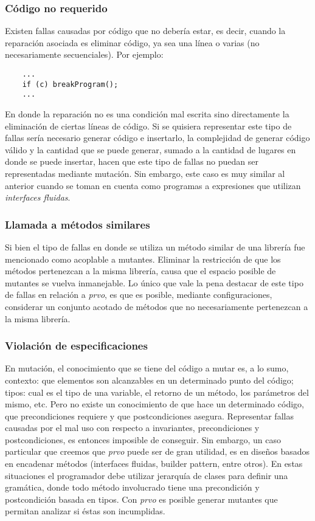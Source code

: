 \subsubsection{C\'odigo no requerido} %

Existen fallas causadas por c\'odigo que no deber\'ia estar, es decir, cuando la reparaci\'on asociada es eliminar c\'odigo, ya sea una l\'inea o varias (no necesariamente secuenciales). Por ejemplo:
\begin{lstlisting}
	...
	if (c) breakProgram();
	...
\end{lstlisting}
En donde la reparaci\'on no es una condici\'on mal escrita sino directamente la eliminaci\'on de ciertas l\'ineas de c\'odigo. Si se quisiera representar este tipo de fallas ser\'ia necesario generar c\'odigo e insertarlo, la complejidad de generar c\'odigo v\'alido y la cantidad que se puede generar, sumado a la cantidad de lugares en donde se puede insertar, hacen que este tipo de fallas no puedan ser representadas mediante mutaci\'on. Sin embargo, este caso es muy similar al anterior cuando se toman en cuenta como programas a expresiones que utilizan \emph{interfaces fluidas}.

\subsubsection{Llamada a m\'etodos similares}

Si bien el tipo de fallas en donde se utiliza un m\'etodo similar de una librer\'ia fue mencionado como acoplable a mutantes. Eliminar la restricci\'on de que los m\'etodos pertenezcan a la misma librer\'ia, causa que el espacio posible de mutantes se vuelva inmanejable. Lo \'unico que vale la pena destacar de este tipo de fallas en relaci\'on a \emph{prvo}, es que es posible, mediante configuraciones, considerar un conjunto acotado de m\'etodos que no necesariamente pertenezcan a la misma librer\'ia.

\subsubsection{Violaci\'on de especificaciones}
\label{sec:prvo.prvoTargetedFaults.specViolations}

En mutaci\'on, el conocimiento que se tiene del c\'odigo a mutar es, a lo sumo, contexto: que elementos son alcanzables en un determinado punto del c\'odigo; tipos: cual es el tipo de una variable, el retorno de un m\'etodo, los par\'ametros del mismo, etc. Pero no existe un conocimiento de que hace un determinado c\'odigo, que precondiciones requiere y que postcondiciones asegura. Representar fallas causadas por el mal uso con respecto a invariantes, precondiciones y postcondiciones, es entonces imposible de conseguir. Sin embargo, un caso particular que creemos que \emph{prvo} puede ser de gran utilidad, es en dise\~nos basados en encadenar m\'etodos (interfaces fluidas, builder pattern, entre otros). En estas situaciones el programador debe utilizar jerarqu\'ia de clases para definir una gram\'atica, donde todo m\'etodo involucrado tiene una precondici\'on y postcondici\'on basada en tipos. Con \emph{prvo} es posible generar mutantes que permitan analizar si \'estas son incumplidas.


